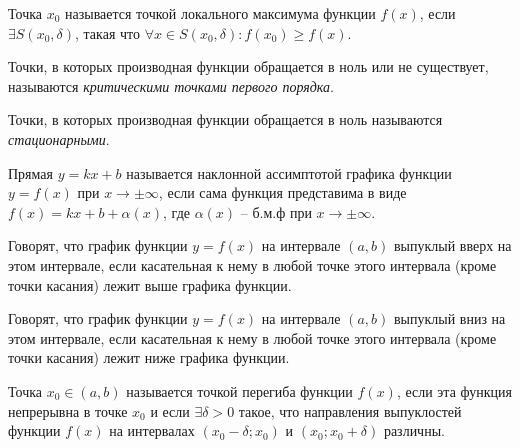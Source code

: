 \begin{definition} \label{def:77}
    Точка $x_0$ называется точкой локального максимума функции $f (x)$, если $\exists S(x_0, \delta)$, такая что $\forall x \in S(x_0, \delta) : f (x_0) \ge f(x)$.
\end{definition}


\begin{definition} \label{def:80}
    Точки, в которых производная функции обращается в ноль или не существует, называются \textit{критическими точками первого порядка}.
\end{definition}


\begin{definition} \label{def:81}
    Точки, в которых производная функции обращается в ноль называются \textit{стационарными}.
\end{definition}


\begin{definition} \label{def:84}
    Прямая $y = kx + b$ называется наклонной ассимптотой графика функции  $y=f(x)$ при $x \to  \pm\infty$, если сама функция представима в виде $f(x) = kx + b + \alpha(x)$, где $\alpha(x)$ -- б.м.ф при $x \to \pm\infty$.
\end{definition}


\begin{definition} \label{def:86}
    Говорят, что график функции $y = f(x)$ на интервале $(a, b)$ выпуклый вверх на этом интервале, если касательная к нему в любой точке этого интервала (кроме точки касания) лежит выше графика функции.
\end{definition}


\begin{definition} \label{def:87}
    Говорят, что график функции $y = f(x)$ на интервале $(a, b)$ выпуклый вниз на этом интервале, если касательная к нему в любой точке этого интервала (кроме точки касания) лежит ниже графика функции.
\end{definition}


\begin{definition} \label{def:88}
    Точка $x_0 \in (a, b)$ называется точкой перегиба функции $f(x)$, если эта функция непрерывна в точке $x_0$ и если $\exists \delta > 0$ такое, что направления выпуклостей функции $f(x)$ на интервалах $(x_0 - \delta; x_0)$ и $(x_0 ; x_0 + \delta)$ различны.
\end{definition}
